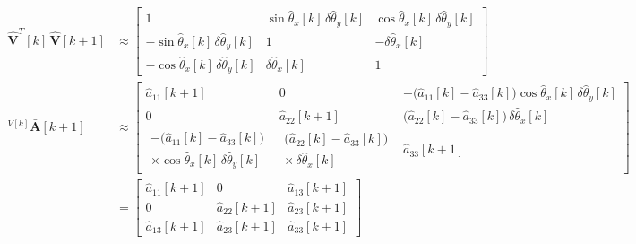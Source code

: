 \documentclass[11pt,a4paper]{ctexart}
\newcommand{\Ab}{\bar{\mathbf A}}
\newcommand{\Vh}{\hat{\mathbf V}}
\newcommand{\T}{T}
\newcommand{\dth}{\delta\hat\theta}
\begin{document}
\begin{align*}
\Vh^{\T}[k]\,\Vh[k+1] &\approx \begin{bmatrix}
1 & \sin\hat\theta_x[k]\,\dth_y[k] & \cos\hat\theta_x[k]\,\dth_y[k] \\
-\sin\hat\theta_x[k]\,\dth_y[k] & 1 & -\dth_x[k] \\
-\cos\hat\theta_x[k]\,\dth_y[k] & \dth_x[k] & 1
\end{bmatrix} \\[4pt]
{}^{V[k]}\Ab[k+1] &\approx \begin{bmatrix}
\hat a_{11}[k+1] & 0 & -\big(\hat a_{11}[k] - \hat a_{33}[k]\big)\cos\hat\theta_x[k]\,\dth_y[k] \\
0 & \hat a_{22}[k+1] & \big(\hat a_{22}[k] - \hat a_{33}[k]\big)\,\dth_x[k] \\
\begin{array}{c} -\big(\hat a_{11}[k] - \hat a_{33}[k]\big) \\ \times\cos\hat\theta_x[k]\,\dth_y[k] \end{array} & \begin{array}{c} \big(\hat a_{22}[k] - \hat a_{33}[k]\big) \\ \times\,\dth_x[k] \end{array} & \hat a_{33}[k+1]
\end{bmatrix} \\
&= \begin{bmatrix} \hat a_{11}[k+1] & 0 & \hat a_{13}[k+1] \\ 0 & \hat a_{22}[k+1] & \hat a_{23}[k+1] \\ \hat a_{13}[k+1] & \hat a_{23}[k+1] & \hat a_{33}[k+1] \end{bmatrix}
\end{align*}

\clearpage
\end{document}
